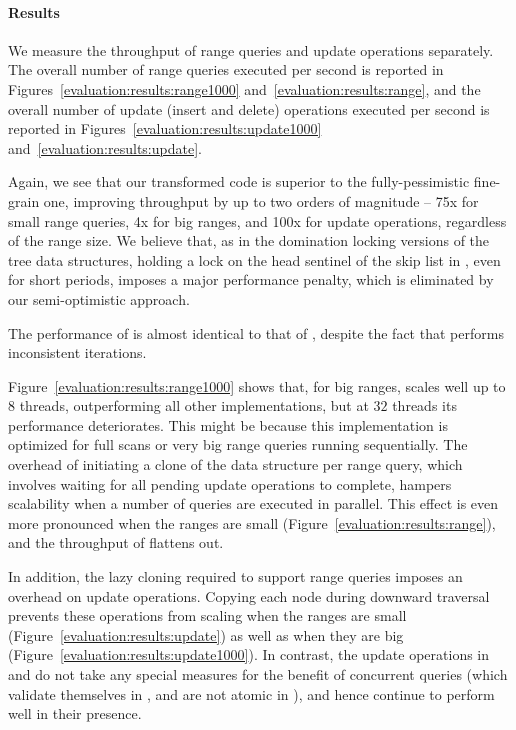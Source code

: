 \paragraph{Results}
We measure the throughput of range queries and update operations separately.
The overall number of range queries executed per second is reported
in Figures~\ref{evaluation:results:range1000}
and~\ref{evaluation:results:range}, and the overall number of update (insert 
and delete) operations executed per second is reported in
Figures~\ref{evaluation:results:update1000} and~\ref{evaluation:results:update}.

Again, we see that our transformed code
 is superior to the fully-pessimistic fine-grain one, improving throughput by
up to two orders of magnitude -- 75x for small range queries, 4x for big
ranges, and 100x for update operations, regardless of the range size. We believe that, 
as in the
domination locking versions of the tree data structures, holding a lock on the head sentinel of the skip list in
\domSkiplist, even for short periods, imposes a major performance penalty,
which is eliminated by our  semi-optimistic approach.

The performance of \autoSkiplist is almost
identical to that of \skiplist, despite the fact that \skiplist performs inconsistent iterations.

Figure~\ref{evaluation:results:range1000}
shows that, for big ranges, \bronson scales well up to $8$ threads, outperforming
all other implementations, but at $32$ threads its performance deteriorates.
This might be because this implementation is
optimized for full scans or very big range queries running sequentially.
The overhead of initiating a clone of the data structure per range query, which 
involves waiting for all 
pending update operations to complete, hampers scalability when 
a number of queries are executed in parallel. This effect is even more pronounced when the
ranges are small (Figure~\ref{evaluation:results:range}), and the throughput of
\bronson flattens out. 
  
In addition, the lazy cloning required to support
range queries imposes an overhead on  update operations. Copying each node
during downward traversal prevents these operations from scaling when
the ranges are small (Figure~\ref{evaluation:results:update}) as well as when
they are big (Figure~\ref{evaluation:results:update1000}). In contrast, 
the update operations in \autoSkiplist and \skiplist do not take any special 
measures for the benefit of concurrent queries (which validate themselves in 
\autoSkiplist, and are not atomic in \skiplist), and hence continue to perform well in 
their presence.
